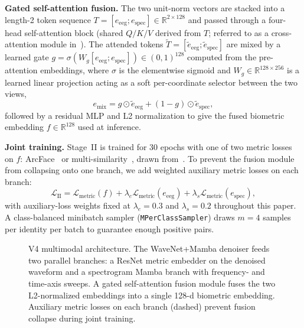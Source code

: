\documentclass{IEEEtran}
\begin{document}
\textbf{Gated self-attention fusion.} The two unit-norm vectors are
stacked into a length-2 token sequence
$T=[e_{\mathrm{eeg}};e_{\mathrm{spec}}]\in\mathbb{R}^{2\times 128}$ and
passed through a four-head self-attention block (shared $Q/K/V$ derived
from $T$; referred to as a cross-attention module in~\cite{b1}). The
attended tokens
$\tilde{T}=[\tilde{e}_{\mathrm{eeg}};\tilde{e}_{\mathrm{spec}}]$ are mixed
by a learned gate
$g=\sigma(W_g[e_{\mathrm{eeg}};e_{\mathrm{spec}}])\in(0,1)^{128}$
computed from the pre-attention embeddings, where $\sigma$ is the
elementwise sigmoid and $W_g\in\mathbb{R}^{128\times 256}$ is a learned
linear projection acting as a soft per-coordinate selector between the
two views,
\begin{equation}
\label{eq:fusion}
e_{\mathrm{mix}}=g\odot \tilde{e}_{\mathrm{eeg}}
+(1-g)\odot \tilde{e}_{\mathrm{spec}},
\end{equation}
followed by a residual MLP and L2 normalization to give the fused
biometric embedding $f\in\mathbb{R}^{128}$ used at inference.

\textbf{Joint training.} Stage~II is trained for 30 epochs with one of
two metric losses on $f$: ArcFace~\cite{b6} or
multi-similarity~\cite{b7}, drawn from~\cite{b20}. To prevent the fusion
module from collapsing onto one branch, we add weighted auxiliary metric
losses on each branch:
\begin{equation}
\label{eq:joint}
\mathcal{L}_{\mathrm{II}}=\mathcal{L}_{\mathrm{metric}}(f)
+\lambda_{e}\mathcal{L}_{\mathrm{metric}}(e_{\mathrm{eeg}})
+\lambda_{s}\mathcal{L}_{\mathrm{metric}}(e_{\mathrm{spec}}),
\end{equation}
with auxiliary-loss weights fixed at $\lambda_{e}=0.3$ and
$\lambda_{s}=0.2$ throughout this paper. A class-balanced minibatch
sampler (\texttt{MPerClassSampler}) draws $m=4$ samples per identity per
batch to guarantee enough positive pairs.

\begin{figure}[t]
\centering
\resizebox{\textwidth}{!}{}
\caption{V4 multimodal architecture. The WaveNet+Mamba denoiser feeds two
parallel branches: a ResNet metric embedder on the denoised waveform and
a spectrogram Mamba branch with frequency- and time-axis sweeps. A gated
self-attention fusion module fuses the two L2-normalized embeddings into
a single 128-d biometric embedding. Auxiliary metric losses on each
branch (dashed) prevent fusion collapse during joint training.}
\label{fig:v4-arch}
\end{figure}
\end{document}
